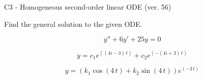 \begin{exercise}
  \begin{exerciseTitle}C3 - Homogeneous second-order linear ODE (ver. 56)\end{exerciseTitle}
  \begin{exerciseStatement}
    
Find the general solution to the given ODE.

    
\[y''+6y'+25y = 0\]

  \end{exerciseStatement}
  \begin{exerciseAnswer}
    
\[y= c_{1} e^{\left(\left(4 i - 3\right) \, t\right)} + c_{2} e^{\left(-\left(4 i + 3\right) \, t\right)}\]

    
\[y= {\left(k_{1} \cos\left(4 \, t\right) + k_{2} \sin\left(4 \, t\right)\right)} e^{\left(-3 \, t\right)}\]

  \end{exerciseAnswer}
\end{exercise}